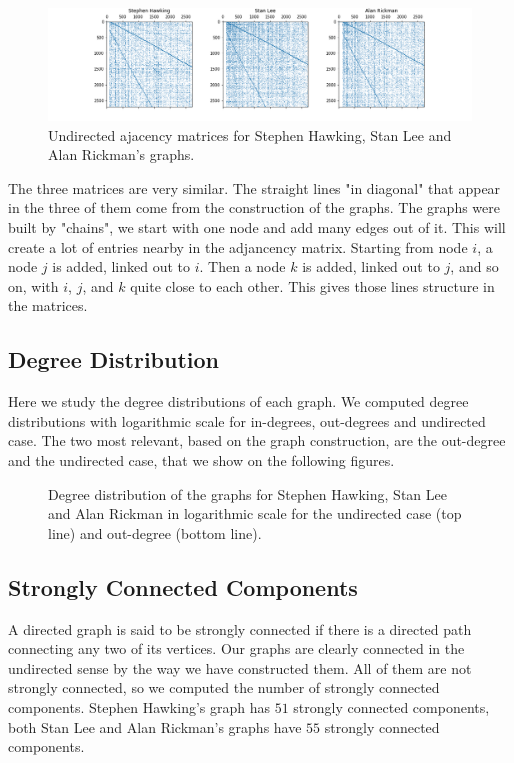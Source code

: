 \documentclass[conference]{IEEEtran}
\begin{document}
\begin{figure}[!htb]
  \includegraphics[width=\linewidth]{matrices.png}
\caption{Undirected ajacency matrices for Stephen Hawking, Stan Lee and Alan Rickman's graphs. }
\end{figure}

The three matrices are very similar. The straight lines "in diagonal" that appear in the three of them come from the construction of the graphs. The graphs were built by "chains", we start with one node and add many edges out of it. This will create a lot of entries nearby in the adjancency matrix. Starting from node $i$, a node $j$ is added, linked out to $i$. Then a node $k$ is added, linked out to $j$, and so on, with $i$, $j$, and $k$ quite close to each other. This gives those lines structure in the matrices. 

\subsection{Degree Distribution}

Here we study the degree distributions of each graph. We computed degree distributions with logarithmic scale for in-degrees, out-degrees and undirected case. The two most relevant, based on the graph construction, are the out-degree and the undirected case, that we show on the following figures. 

\begin{figure}[!htb]
\caption{Degree distribution of the graphs for Stephen Hawking, Stan Lee and Alan Rickman in logarithmic scale for the undirected case (top line) and out-degree (bottom line).  }
\end{figure}


\subsection{Strongly Connected Components}

A directed graph is said to be strongly connected if there is a directed path connecting any two of its vertices. Our graphs are clearly connected in the undirected sense by the way we have constructed them. All of them are not strongly connected, so we computed the number of strongly connected components. Stephen Hawking's graph has $51$ strongly connected components, both Stan Lee and Alan Rickman's graphs have $55$ strongly connected components. 
\end{document}
